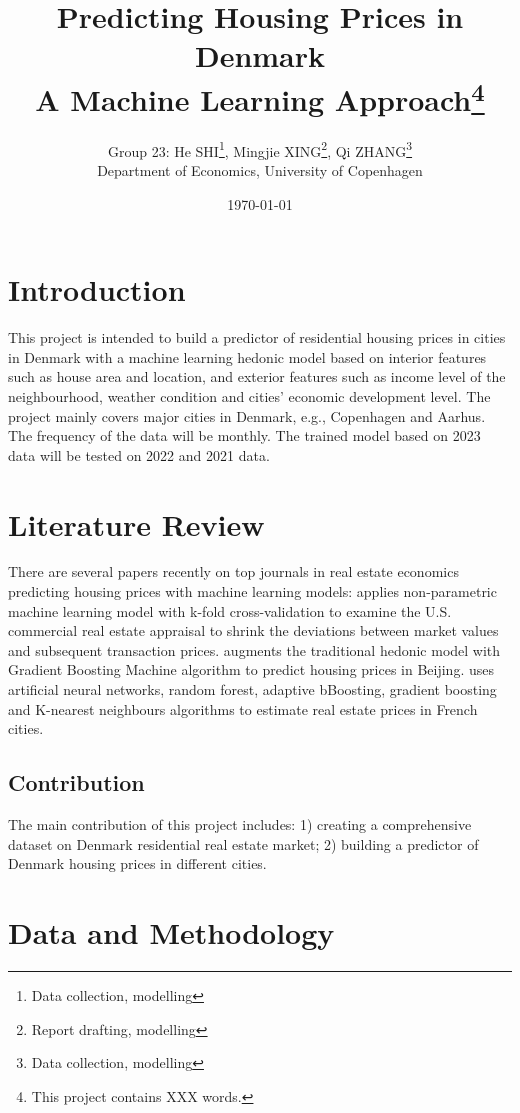 \documentclass[12pt]{article} %
\title{Predicting Housing Prices in Denmark\\ A Machine Learning Approach\footnote{This project contains XXX words.}}
\author{Group 23: He SHI\thanks{Data collection, modelling}, Mingjie XING\thanks{Report drafting, modelling}, Qi ZHANG\thanks{Data collection, modelling} \\Department of Economics, University of Copenhagen}
\date{\today} %
\begin{document}
\maketitle


\section{Introduction}
  		This project is intended to build a predictor of residential housing prices in cities in Denmark with a machine learning hedonic model based on interior features such as house area and location, and exterior features such as income level of the neighbourhood, weather condition and cities' economic development level. The project mainly covers major cities in Denmark, e.g., Copenhagen and Aarhus. The frequency of the data will be monthly. The trained model based on 2023 data will be tested on 2022 and 2021 data. 
				

\section{Literature Review}
		There are several papers recently on top journals in real estate economics predicting housing prices with machine learning models: \newline
		\cite{Deppneretal2023} applies non-parametric machine learning model with k-fold cross-validation to examine the U.S. commercial real estate appraisal to shrink the deviations between market values and subsequent transaction prices. \newline
		\cite{Linetal2023} augments the traditional hedonic model with Gradient Boosting Machine algorithm to predict housing prices in Beijing. \newline
		\cite{TchuenteNyawa2022} uses artificial neural networks, random forest, adaptive bBoosting, gradient boosting and K-nearest neighbours algorithms to estimate real estate prices in French cities.
	\subsection{Contribution}
		The main contribution of this project includes: 1) creating a comprehensive dataset on Denmark residential real estate market; 2) building a predictor of Denmark housing prices in different cities.

		

\section{Data and Methodology}
\end{document}
